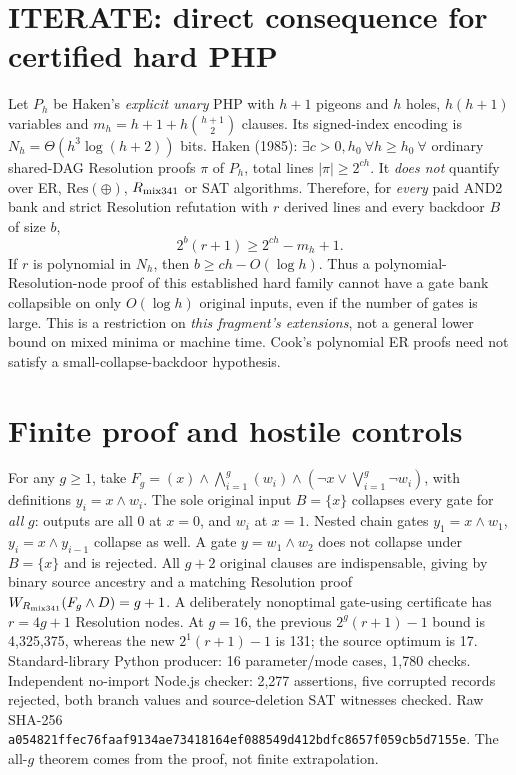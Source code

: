 \documentclass[11pt]{article}
\begin{document}
\section*{ITERATE: direct consequence for certified hard PHP}
Let $P_h$ be Haken's \emph{explicit unary} PHP with $h+1$ pigeons and $h$ holes, $h(h+1)$ variables and $m_h=h+1+h\binom{h+1}{2}$ clauses. Its signed-index encoding is $N_h=\Theta(h^3\log(h+2))$ bits. Haken (1985): $\exists c>0,h_0\ \forall h\ge h_0\ \forall$ ordinary shared-DAG Resolution proofs $\pi$ of $P_h$, total lines $|\pi|\ge 2^{ch}$. It \emph{does not} quantify over ER, $\mathrm{Res}(\oplus)$, $R_{\rm mix341}$ or SAT algorithms. Therefore, for \emph{every} paid AND2 bank and strict Resolution refutation with $r$ derived lines and every backdoor $B$ of size $b$,
\[
\boxed{2^b(r+1)\ge2^{ch}-m_h+1.}
\]
If $r$ is polynomial in $N_h$, then $b\ge ch-O(\log h)$. Thus a polynomial-Resolution-node proof of this established hard family cannot have a gate bank collapsible on only $O(\log h)$ original inputs, even if the number of gates is large. This is a restriction on \emph{this fragment's extensions}, not a general lower bound on mixed minima or machine time. Cook's polynomial ER proofs need not satisfy a small-collapse-backdoor hypothesis.
\section*{Finite proof and hostile controls}
For any $g\ge1$, take $F_g=(x)\land\bigwedge_{i=1}^g(w_i)\land(\neg x\vee\bigvee_{i=1}^g\neg w_i)$, with definitions $y_i=x\land w_i$. The sole original input $B=\{x\}$ collapses every gate for \emph{all} $g$: outputs are all 0 at $x=0$, and $w_i$ at $x=1$. Nested chain gates $y_1=x\land w_1$, $y_i=x\land y_{i-1}$ collapse as well. A gate $y=w_1\land w_2$ does not collapse under $B=\{x\}$ and is rejected. All $g+2$ original clauses are indispensable, giving by binary source ancestry and a matching Resolution proof $W_{R_{\rm mix341}}(F_g\land D)=g+1$. A deliberately nonoptimal gate-using certificate has $r=4g+1$ Resolution nodes.
At $g=16$, the previous $2^g(r+1)-1$ bound is 4,325,375, whereas the new $2^1(r+1)-1$ is 131; the source optimum is 17. Standard-library Python producer: 16 parameter/mode cases, 1,780 checks. Independent no-import Node.js checker: 2,277 assertions, five corrupted records rejected, both branch values and source-deletion SAT witnesses checked. Raw SHA-256 \texttt{a054821ffec76faaf9134ae73418164ef088549d412bdfc8657f059cb5d7155e}. The all-$g$ theorem comes from the proof, not finite extrapolation.
\end{document}
